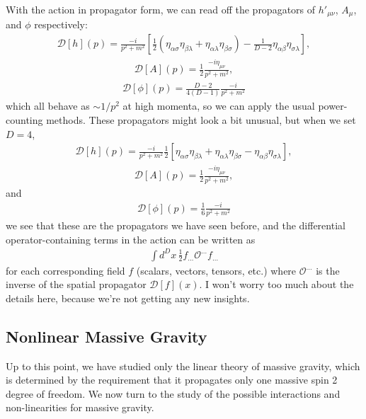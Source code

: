 \documentclass{book}
\theoremstyle{definition}
\newcommand{\f}[2]{\frac{#1}{#2}}
\newcommand{\lp}{\left(}
\newcommand{\rp}{\right)}
\newcommand{\lb}{\left[}
\newcommand{\rb}{\right]}
\newcommand{\D}{\mathcal{D}}
\begin{document}
With the action in propagator form, we can read off the propagators of $h'_{\mu\nu}$, $A_\mu$, and $\phi$ respectively:
\begin{align}
\D[h](p) = \f{-i}{p^2 + m^2}\lb \f{1}{2}\lp \eta_{\alpha\sigma}\eta_{\beta\lambda} + \eta_{\alpha\lambda}\eta_{\beta\sigma} \rp - \f{1}{D-2}\eta_{\alpha\beta}\eta_{\sigma\lambda} \rb,
\end{align}
\begin{align}
\D[A](p) = \f{1}{2}\f{-i\eta_{\mu\nu}}{p^2+m^2},
\end{align}
\begin{align}
\D[\phi](p) = \f{D-2}{4(D-1)}\f{-i}{p^2+m^2}
\end{align}
which all behave as $\sim 1/p^2$ at high momenta, so we can apply the usual power-counting methods. These propagators might look a bit unusual, but when we set $D=4$,
\begin{align}
\D[h](p) = \f{-i}{p^2 + m^2}\f{1}{2}\lb \eta_{\alpha\sigma}\eta_{\beta\lambda} + \eta_{\alpha\lambda}\eta_{\beta\sigma}  - \eta_{\alpha\beta}\eta_{\sigma\lambda} \rb,
\end{align}
\begin{align}
\D[A](p) = \f{1}{2}\f{-i\eta_{\mu\nu}}{p^2+m^2},
\end{align}
and
\begin{align}
\D[\phi](p) = \f{1}{6}\f{-i}{p^2+m^2}
\end{align}
we see that these are the propagators we have seen before, and the differential operator-containing terms in the action can be written as
\begin{align}
\int d^Dx\, \f{1}{2} f_{\dots} \mathcal{O}^{\dots} f_{\dots}
\end{align}
for each corresponding field $f$ (scalars, vectors, tensors, etc.) where $\mathcal{O}^{\dots}$ is the inverse of the spatial propagator $\D[f](x)$. I won't worry too much about the details here, because we're not getting any new insights.  






  





\newpage


\subsection{Nonlinear Massive Gravity}

Up to this point, we have studied only the linear theory of massive gravity, which is determined by the requirement that it propagates only one massive spin 2 degree of freedom. We now turn to the study of the possible interactions and non-linearities for massive gravity. 
 
\end{document}
